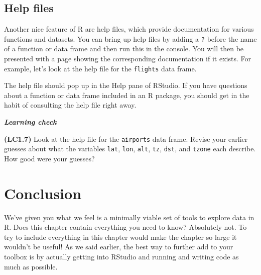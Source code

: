 \documentclass[]{book}
\begin{document}
\begin{learncheck}
\vspace{-0.25in}
\vspace{-0.25in}
\end{learncheck}

\hypertarget{help-files}{%
\subsection{Help files}\label{help-files}}

Another nice feature of R are help files, which provide documentation for various functions and datasets. You can bring up help files by adding a \texttt{?}  before the name of a function or data frame and then run this in the console. You will then be presented with a page showing the corresponding documentation if it exists. For example, let's look at the help file for the \texttt{flights} data frame.

The help file should pop up in the Help pane of RStudio. If you have questions about a function or data frame included in an R package, you should get in the habit of consulting the help file right away.

\begin{learncheck}
\vspace{-0.25in}

\textbf{\emph{Learning check}} \vspace{-0.25in}
\end{learncheck}

\textbf{(LC1.7)} Look at the help file for the \texttt{airports} data frame. Revise your earlier guesses about what the variables \texttt{lat}, \texttt{lon}, \texttt{alt}, \texttt{tz}, \texttt{dst}, and \texttt{tzone} each describe. How good were your guesses?

\begin{learncheck}
\vspace{-0.25in}
\vspace{-0.25in}
\end{learncheck}

\hypertarget{conclusion}{%
\section{Conclusion}\label{conclusion}}

We've given you what we feel is a minimally viable set of tools to explore data in R. Does this chapter contain everything you need to know? Absolutely not. To try to include everything in this chapter would make the chapter so large it wouldn't be useful! As we said earlier, the best way to further add to your toolbox is by actually getting into RStudio and running and writing code as much as possible.
\end{document}
